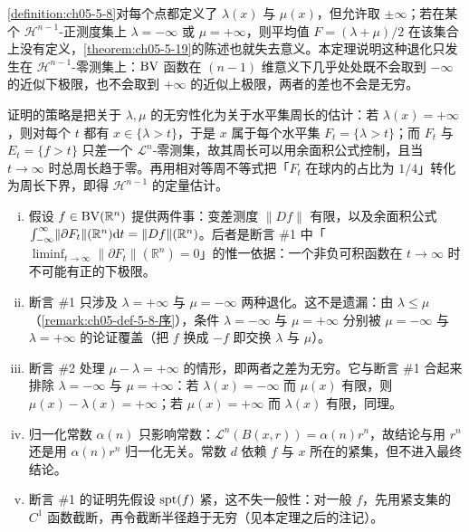 \documentclass[../../main.tex]{subfiles}%
\begin{document}
\begin{remark}\label{remark:ch05-thm-5-18-动机}
\cref{definition:ch05-5-8}对每个点都定义了 $\lambda(x)$ 与 $\mu(x)$，但允许取 $\pm\infty$；若在某个 $\mathcal{H}^{n-1}$-正测度集上 $\lambda=-\infty$ 或 $\mu=+\infty$，则平均值 $F=(\lambda+\mu)/2$ 在该集合上没有定义，\cref{theorem:ch05-5-19}的陈述也就失去意义。本定理说明这种退化只发生在 $\mathcal{H}^{n-1}$-零测集上：$\mathrm{BV}$ 函数在 $(n-1)$ 维意义下几乎处处既不会取到 $-\infty$ 的近似下极限，也不会取到 $+\infty$ 的近似上极限，两者的差也不会是无穷。 %

证明的策略是把关于 $\lambda,\mu$ 的无穷性化为关于水平集周长的估计：若 $\lambda(x)=+\infty$，则对每个 $t$ 都有 $x\in\{\lambda>t\}$，于是 $x$ 属于每个水平集 $F_t=\{\lambda>t\}$；而 $F_t$ 与 $E_t=\{f>t\}$ 只差一个 $\mathcal{L}^n$-零测集，故其周长可以用余面积公式控制，且当 $t\to\infty$ 时总周长趋于零。再用相对等周不等式把「$F_t$ 在球内的占比为 $1/4$」转化为周长下界，即得 $\mathcal{H}^{n-1}$ 的定量估计。
\end{remark}

\begin{remark}\label{remark:ch05-thm-5-18-条件}
\begin{enumerate}[(i)]
\item 假设 $f\in\mathrm{BV}(\mathbb{R}^n)$ 提供两件事：变差测度 $\lVert Df\rVert$ 有限，以及余面积公式 $\int_{-\infty}^{\infty}\lVert\partial F_t\rVert(\mathbb{R}^n)\mathrm{d} t=\lVert Df\rVert(\mathbb{R}^n)$。后者是断言 \#1 中「$\liminf_{t\to\infty}\lVert\partial F_t\rVert(\mathbb{R}^n)=0$」的惟一依据：一个非负可积函数在 $t\to\infty$ 时不可能有正的下极限。
\item 断言 \#1 只涉及 $\lambda=+\infty$ 与 $\mu=-\infty$ 两种退化。这不是遗漏：由 $\lambda\leqslant\mu$（\cref{remark:ch05-def-5-8-序}），条件 $\lambda=-\infty$ 与 $\mu=+\infty$ 分别被 $\mu=-\infty$ 与 $\lambda=+\infty$ 的论证覆盖（把 $f$ 换成 $-f$ 即交换 $\lambda$ 与 $\mu$）。%
\item 断言 \#2 处理 $\mu-\lambda=+\infty$ 的情形，即两者之差为无穷。它与断言 \#1 合起来排除 $\lambda=-\infty$ 与 $\mu=+\infty$：若 $\lambda(x)=-\infty$ 而 $\mu(x)$ 有限，则 $\mu(x)-\lambda(x)=+\infty$；若 $\mu(x)=+\infty$ 而 $\lambda(x)$ 有限，同理。
\item 归一化常数 $\alpha(n)$ 只影响常数：$\mathcal{L}^n(B(x,r))=\alpha(n)r^n$，故结论与用 $r^n$ 还是用 $\alpha(n)r^n$ 归一化无关。常数 $d$ 依赖 $f$ 与 $x$ 所在的紧集，但不进入最终结论。
\item 断言 \#1 的证明先假设 $\operatorname{spt}(f)$ 紧，这不失一般性：对一般 $f$，先用紧支集的 $C^1$ 函数截断，再令截断半径趋于无穷（见本定理之后的注记）。
\end{enumerate}
\end{remark}
\end{document}
